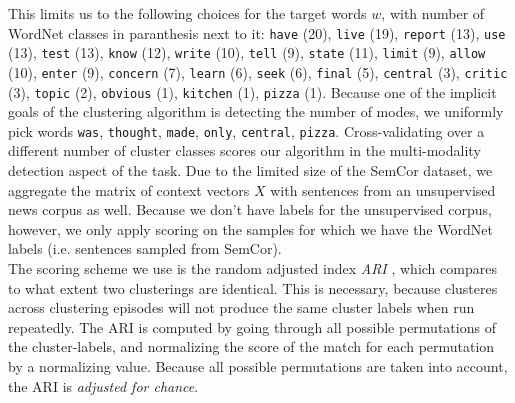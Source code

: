 \documentclass[a4paper,12pt,twoside,openright]{report}
\begin{document}
This limits us to the following choices for the target words $w$, with number of WordNet classes in paranthesis next to it: 
\Verb#have# (20), \Verb#live# (19), \Verb#report# (13), \Verb#use# (13), \Verb#test# (13), \Verb#know# (12), \Verb#write# (10), \Verb#tell# (9), \Verb#state# (11), \Verb#limit# (9), \Verb#allow# (10), \Verb#enter# (9), \Verb#concern# (7), \Verb#learn# (6), \Verb#seek# (6), \Verb#final# (5), \Verb#central# (3), \Verb#critic# (3), \Verb#topic# (2), \Verb#obvious# (1), \Verb#kitchen# (1), \Verb#pizza# (1).
Because one of the implicit goals of the clustering algorithm is detecting the number of modes, we uniformly pick words \Verb#was#, \Verb#thought#, \Verb#made#, \Verb#only#, \Verb#central#, \Verb#pizza#.
Cross-validating over a different number of cluster classes scores our algorithm in the multi-modality detection aspect of the task.
Due to the limited size of the SemCor dataset, we aggregate the matrix of context vectors $X$ with sentences from an unsupervised news corpus as well.
Because we don't have labels for the unsupervised corpus, however, we only apply scoring on the samples for which we have the WordNet labels (i.e. sentences sampled from SemCor). \\

The scoring scheme we use is the random adjusted index \textit{ARI} \cite{rand71}, \cite{hubert85} which compares to what extent two clusterings are identical.
This is necessary, because clusteres across clustering episodes will not produce the same cluster labels when run repeatedly.
The ARI is computed by going through all possible permutations of the cluster-labels, and normalizing the score of the match for each permutation by a normalizing value.
Because all possible permutations are taken into account, the ARI is \textit{adjusted for chance}.
\end{document}
